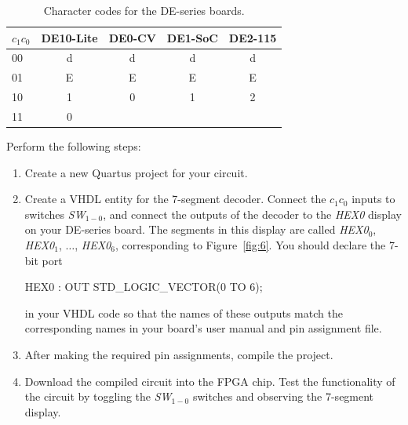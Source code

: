 \documentclass[epsfig,10pt,fullpage]{article}
\begin{document}
\begin{table}[H]
	\begin{center}
	\begin{tabular}{l | c | c | c | c}
	$c_1 c_0$ & DE10-Lite & DE0-CV & DE1-SoC & DE2-115 \\
	\hline
	{\rule[0mm]{0mm}{5mm}\hspace{0.75 mm} 00} & d & d & d & d \\
	\hspace{0.75 mm}
	01 & E & E & E & E \\
	\hspace{0.75 mm}
	10 & 1 & 0 & 1 & 2 \\
	\hspace{0.75 mm}
	11 & 0 & & & \\
	\end{tabular}
	\caption{Character codes for the DE-series boards.}
	\label{tab:codes}
	\end{center}
\end{table}

Perform the following steps:

\begin{enumerate}
\item Create a new Quartus project for your circuit.
\item Create a VHDL entity for the 7-segment decoder. Connect the $c_1 c_0$ inputs
to switches {\it SW}$_{1-0}$, and connect the outputs of the decoder to the {\it HEX0} 
display on your DE-series board. The segments in this display are called 
{\it HEX0}$_0$, {\it HEX0}$_1$, $\ldots$, {\it HEX0}$_6$, corresponding to  Figure~\ref{fig:6}.
You should declare the 7-bit port 

\begin{center}
\begin{minipage}[t]{12.5 cm}
\begin{tabbing}
HEX0 : OUT STD\_LOGIC\_VECTOR(0 TO 6);
\end{tabbing}
\end{minipage}
\end{center}

in your VHDL code so that the
names of these outputs match the corresponding names in your board's user manual and pin assignment file.
\item After making the required pin assignments, compile the project.
\item Download the compiled circuit into the FPGA chip. Test the functionality of the 
circuit by toggling the {\it SW}$_{1-0}$ switches and observing the 7-segment display.
\end{enumerate}
\end{document}
